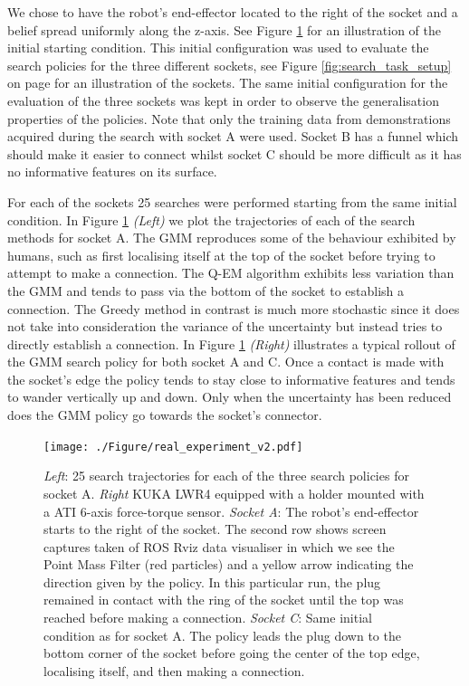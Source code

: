 \documentclass[final,5p,times,twocolumn]{elsarticle}
\begin{document}
We chose to have the robot's end-effector located to the right of the socket and a belief spread uniformly 
along the z-axis. See Figure \ref{fig:real_pictures} for an illustration of the initial starting condition.
This initial configuration was used to evaluate the search policies for the three different sockets, see Figure \ref{fig:search_task_setup} 
on page \pageref{fig:search_task_setup} for an illustration of the sockets. The same initial configuration for 
the evaluation of the three sockets was kept in order to observe the generalisation properties of the policies. 
Note that only the training data from demonstrations acquired during the search with socket A were used. 
Socket B has a funnel which should make it easier to connect whilst socket C should be more difficult as it has no informative features on its surface. 

For each of the sockets 25 searches were performed starting from the same initial condition. 
In Figure \ref{fig:real_pictures} \textit{(Left)} we plot the trajectories of each of the search methods for socket A. The GMM reproduces some of the behaviour exhibited by humans, such as 
first localising itself at the top of the socket before trying to attempt to make a connection. The Q-EM algorithm exhibits less variation
than the GMM and tends to pass via the bottom of the socket to establish a connection. The Greedy method in contrast is much more  
stochastic since it does not take into consideration the variance of the uncertainty but instead tries to directly establish a connection.
In Figure \ref{fig:real_pictures} \textit{(Right)} illustrates a typical rollout of the GMM search policy for both 
socket A and C. Once a contact is made with the socket's edge the policy tends to stay close to informative features and tends to 
wander vertically up and down. Only when the uncertainty has been reduced does the GMM policy go towards the socket's connector. 

\begin{figure}
 \centering
 \texttt{[image: ./Figure/real\_experiment\_v2.pdf]}
 \caption{\textit{Left}: 25 search trajectories for each of the three search policies for socket A. 
 \textit{Right} KUKA LWR4 equipped with a holder mounted with a ATI 6-axis force-torque sensor. \textit{Socket A}: The robot's end-effector starts to the 
 right of the socket. The second row shows screen captures taken of ROS Rviz data visualiser in which we see the Point Mass Filter 
 (red particles) and a yellow arrow indicating the direction given by the policy. In this particular run, the plug remained in contact with the ring of the socket until 
 the top was reached before making a connection. \textit{Socket C}: Same initial condition as for socket A. The policy leads the plug down to 
 the bottom corner of the socket before going the center of the top edge, localising itself, and then making a connection.}
 \label{fig:real_pictures}
\end{figure}
\end{document}
